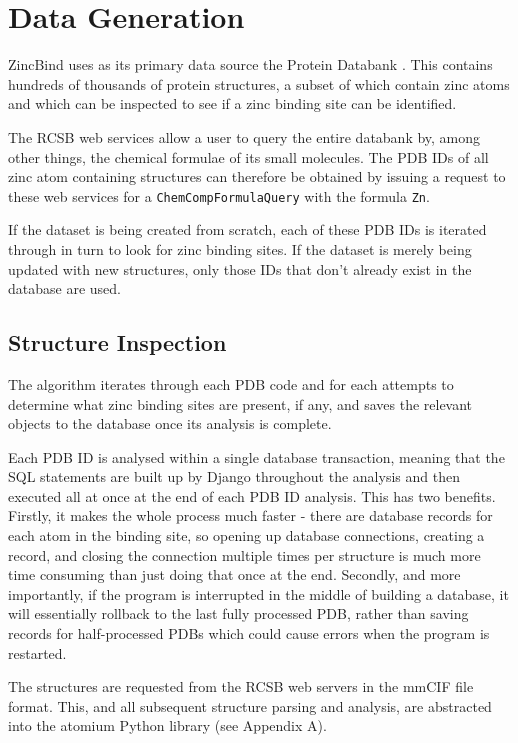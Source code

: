 \section{Data Generation}

ZincBind uses as its primary data source the Protein Databank \cite{berman2000pdb}. This contains hundreds of thousands of protein structures, a subset of which contain zinc atoms and which can be inspected to see if a zinc binding site can be identified.

The RCSB web services \cite{burley2020pdb} allow a user to query the entire databank by, among other things, the chemical formulae of its small molecules. The PDB IDs of all zinc atom containing structures can therefore be obtained by issuing a request to these web services for a \verb|ChemCompFormulaQuery| with the formula \verb|Zn|.

If the dataset is being created from scratch, each of these PDB IDs is iterated through in turn to look for zinc binding sites. If the dataset is merely being updated with new structures, only those IDs that don't already exist in the database are used.

\subsection{Structure Inspection}

The algorithm iterates through each PDB code and for each attempts to determine what zinc binding sites are present, if any, and saves the relevant objects to the database once its analysis is complete.

Each PDB ID is analysed within a single database transaction, meaning that the SQL statements are built up by Django throughout the analysis and then executed all at once at the end of each PDB ID analysis. This has two benefits. Firstly, it makes the whole process much faster - there are database records for each atom in the binding site, so opening up database connections, creating a record, and closing the connection multiple times per structure is much more time consuming than just doing that once at the end. Secondly, and more importantly, if the program is interrupted in the middle of building a database, it will essentially rollback to the last fully processed PDB, rather than saving records for half-processed PDBs which could cause errors when the program is restarted.

The structures are requested from the RCSB web servers in the mmCIF file format. This, and all subsequent structure parsing and analysis, are abstracted into the atomium Python library (see Appendix A).

